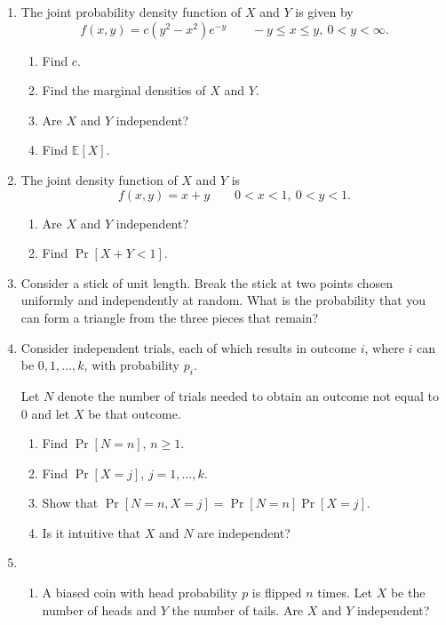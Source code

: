\documentclass[11pt,letterpaper]{article}
\newcommand{\E}{\mathbb{E}}
\begin{document}
\begin{enumerate}
    \item The joint probability density function of $X$ and $Y$ is given by
    \[
        f(x,y) = c(y^2-x^2)e^{-y}\qquad -y\leq x\leq y,\ 0<y<\infty.
    \]
    \begin{enumerate}
        \item Find $c$.
        \item Find the marginal densities of $X$ and $Y$.
        \item Are $X$ and $Y$ independent?
        \item Find $\E[X]$.
    \end{enumerate}


    \item The joint density function of $X$ and $Y$ is
    \[
        f(x,y) = x+y\qquad 0<x<1,\ 0<y<1.
    \]
    \begin{enumerate}
        \item Are $X$ and $Y$ independent?
        \item Find $\Pr[X+Y<1]$.
    \end{enumerate}


    \item Consider a stick of unit length.
    Break the stick at two points chosen uniformly and independently at random.
    What is the probability that you can form a triangle from the three pieces that remain?


    \item Consider independent trials, each of which results in outcome $i$, where $i$ can be $0, 1, \ldots, k$, with probability $p_i$.

    Let $N$ denote the number of trials needed to obtain an outcome not equal to 0 and let $X$ be that outcome.

    \begin{enumerate}
        \item Find $\Pr[N = n]$, $n\geq 1$.
        \item Find $\Pr[X = j]$, $j = 1, \ldots, k$.
        \item Show that $\Pr[N= n, X=j] = \Pr[N=n]\Pr[X=j]$.
        \item Is it intuitive that $X$ and $N$ are independent?
    \end{enumerate}
    

    \item \begin{enumerate}
        \item A biased coin with head probability $p$ is flipped $n$ times.
        Let $X$ be the number of heads and $Y$ the number of tails.
        Are $X$ and $Y$ independent?


\end{enumerate}
\end{enumerate}
\end{document}
